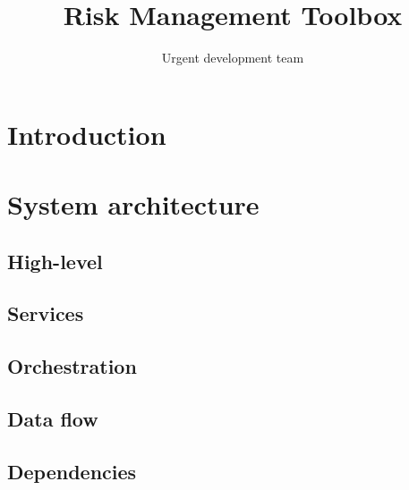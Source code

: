 \documentclass{article}
\title{Risk Management Toolbox}
\author{Urgent development team}
\begin{document}
	\maketitle
	\section{Introduction}
	\section{System architecture}
	\subsection{High-level}
	\subsection{Services}
	
	
	
	
	\subsection{Orchestration}
	\subsection{Data flow}
	\subsection{Dependencies}
	
	
\end{document}
